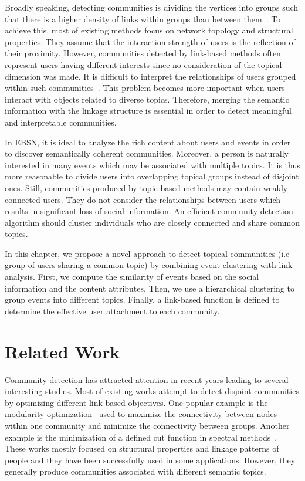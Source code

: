 Broadly speaking, detecting communities is dividing the vertices into groups such that there is a higher density of links within groups than between them~\cite{Clauset:PR04}. To achieve this, most of existing methods focus on network topology and structural properties. They assume that the interaction strength of users is the reflection of their proximity. However, communities detected by link-based methods often represent users having different interests since no consideration of the topical dimension was made. It is difficult to interpret the relationships of users grouped within such communities~\cite{Juan:cason11,Zhongying:12}. This problem becomes more important when users interact with objects related to diverse topics. Therefore, merging the semantic information with the linkage structure is essential in order to detect meaningful and interpretable communities. 

In EBSN, it is ideal to analyze the rich content about users and events in order to discover semantically coherent communities. Moreover, a person is naturally interested in many events which may be associated with multiple topics. It is thus more reasonable to divide users into overlapping topical groups instead of disjoint ones. Still, communities produced by topic-based methods may contain weakly connected users. They do not consider the relationships between users which results in significant loss of social information. An efficient community detection algorithm should cluster individuals who are closely connected and share common topics. 

In this chapter, we propose a novel approach to detect topical communities (i.e group of users sharing a common topic) by combining event clustering with link analysis. First, we compute the similarity of events based on the social information and the content attributes. Then, we use a hierarchical clustering to group events into different topics. Finally, a link-based function is defined to determine the effective user attachment to each community. 

\section{Related Work} \label{sec:related-work-com}
Community detection has attracted attention in recent years leading to several interesting studies. Most of existing works attempt to detect disjoint communities by optimizing different link-based objectives. One popular example is the modularity optimization~\cite{Clauset:PR04,Newman:04} used to maximize the connectivity between nodes within one community and minimize the connectivity between groups. Another example is the minimization of a defined cut function in spectral methods~\cite{Scott:05}. These works mostly focused on structural properties and linkage patterns of people and they have been successfully used in some applications. However, they generally produce communities associated with different semantic topics.

